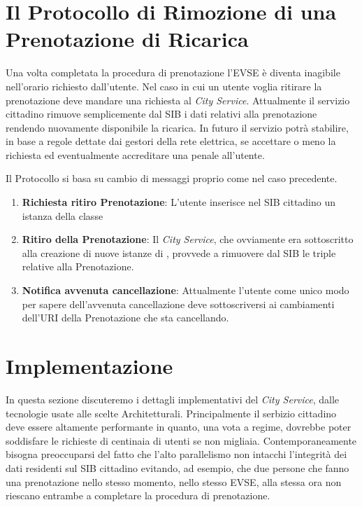 \section{Il Protocollo di Rimozione di una Prenotazione di Ricarica}

Una volta completata la procedura di prenotazione l'EVSE è diventa inagibile nell'orario richiesto dall'utente. Nel caso in cui un utente voglia ritirare la prenotazione deve mandare una richiesta al \emph{City Service}. Attualmente il servizio cittadino rimuove semplicemente dal SIB i dati relativi alla prenotazione rendendo nuovamente disponibile la ricarica. In futuro il servizio potrà stabilire, in base a regole dettate dai gestori della rete elettrica, se accettare o meno la richiesta ed eventualmente accreditare una penale all'utente.

Il Protocollo si basa su cambio di messaggi proprio come nel caso precedente.

\begin{enumerate}
	\item \textbf{Richiesta ritiro Prenotazione}: L'utente inserisce nel SIB cittadino un istanza della classe  
	\item \textbf{Ritiro della Prenotazione}: Il \emph{City Service}, che ovviamente era sottoscritto alla creazione di nuove istanze di , provvede a rimuovere dal SIB le triple relative alla Prenotazione.
	\item \textbf{Notifica avvenuta cancellazione}: Attualmente l'utente come unico modo per sapere dell'avvenuta cancellazione deve sottoscriversi ai cambiamenti dell'URI della Prenotazione che sta cancellando.
\end{enumerate}

\section{Implementazione}\label{sec:impl}

In questa sezione discuteremo i dettagli implementativi del \emph{City Service}, dalle tecnologie usate alle scelte Architetturali. Principalmente il serbizio cittadino deve essere altamente performante in quanto, una vota a regime, dovrebbe poter soddisfare le richieste di centinaia di utenti se non migliaia. Contemporaneamente bisogna preoccuparsi del fatto che l'alto parallelismo non intacchi l'integrità dei dati residenti sul SIB cittadino evitando, ad esempio, che due persone che fanno una prenotazione nello stesso momento, nello stesso EVSE, alla stessa ora non riescano entrambe a completare la procedura di prenotazione. 

